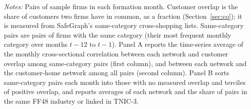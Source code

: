 \begin{table}[!htbp]
\par\vspace{4pt}\begin{minipage}{\linewidth}\scriptsize \emph{Notes:} Pairs of sample firms in each formation month. Customer overlap is the share of customers two firms have in common, as a fraction (Section~\ref{sec:co}); it is measured from SafeGraph's same-category cross-shopping lists. Same-category pairs are pairs of firms with the same category (their most frequent monthly category over months $t-12$ to $t-1$). Panel A reports the time-series average of the monthly cross-sectional correlation between each network and customer overlap among same-category pairs (first column), and between each network and the customer-home network among all pairs (second column). Panel B sorts same-category pairs each month into those with no measured overlap and terciles of positive overlap, and reports averages of each network and the share of pairs in the same FF48 industry or linked in TNIC-3.\end{minipage}
\end{table}